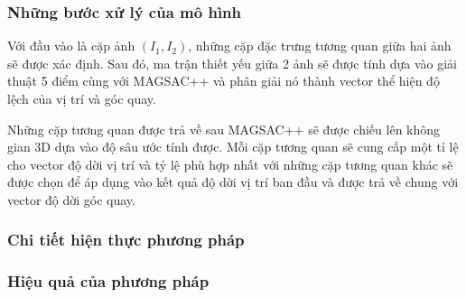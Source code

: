 \subsubsection*{Những bước xử lý của mô hình}

Với đầu vào là cặp ảnh $(I_1,I_2)$, những cặp đặc trưng tương quan giữa hai ảnh sẽ được xác định. Sau đó, ma trận thiết yếu giữa 2 ảnh sẽ được tính dựa vào giải thuật 5 điểm \cite{nister2004efficient} cùng với MAGSAC++ \cite{barath2020magsac++} và phân giải nó thành vector thể hiện độ lệch của vị trí và góc quay. 

Những cặp tương quan được trả về sau MAGSAC++ sẽ được chiếu lên không gian 3D dựa vào độ sâu ước tính được. Mỗi cặp tương quan sẽ cung cấp một tỉ lệ cho vector độ dời vị trí và tỷ lệ phù hợp nhất với những cặp tương quan khác sẽ được chọn để áp dụng vào kết quả độ dời vị trí ban đầu và được trả về chung với vector độ dời góc quay.

\subsubsection*{Chi tiết hiện thực phương pháp}

\subsubsection*{Hiệu quả của phương pháp}


